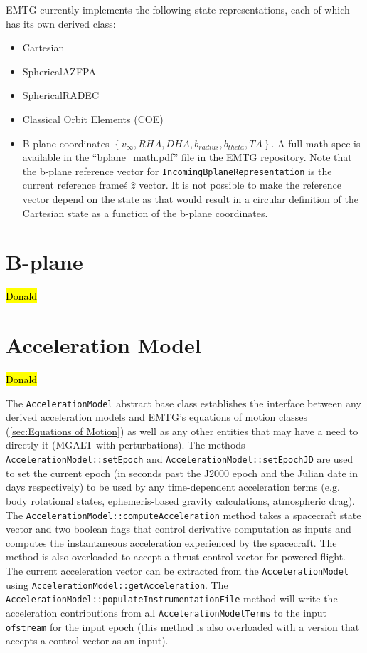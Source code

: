EMTG currently implements the following state representations, each of which has its own derived class:
\begin{itemize}
	\item Cartesian
	\item SphericalAZFPA
	\item SphericalRADEC
	\item Classical Orbit Elements (COE)
	\item B-plane coordinates $\left\{v_\infty, RHA, DHA, b_{radius}, b_{theta}, TA\right\}$. A full math spec is available in the ``bplane\_math.pdf'' file in the EMTG repository. Note that the b-plane reference vector for \texttt{IncomingBplaneRepresentation} is the current reference frame\'s $\hat z$ vector. It is not possible to make the reference vector depend on the state as that would result in a circular definition of the Cartesian state as a function of the b-plane coordinates.
\end{itemize}

\section{B-plane}
\label{sec:bplane}

\hl{Donald}

\section{Acceleration Model}
\label{sec:acceleration_model}

\hl{Donald}

The \texttt{AccelerationModel} abstract base class establishes the interface between any derived acceleration models and EMTG's equations of motion classes (\ref{sec:Equations of Motion}) as well as any other entities that may have a need to directly it (MGALT with perturbations). The methods \texttt{AccelerationModel::setEpoch} and \texttt{AccelerationModel::setEpochJD} are used to set the current epoch (in seconds past the J2000 epoch and the Julian date in days respectively) to be used by any time-dependent acceleration terms (e.g. body rotational states, ephemeris-based gravity calculations, atmospheric drag). The \texttt{AccelerationModel::computeAcceleration} method takes a spacecraft state vector and two boolean flags that control derivative computation as inputs and computes the instantaneous acceleration experienced by the spacecraft. The method is also overloaded to accept a thrust control vector for powered flight. The current acceleration vector can be extracted from the \texttt{AccelerationModel} using \texttt{AccelerationModel::getAcceleration}. The \texttt{AccelerationModel::populateInstrumentationFile} method will write the acceleration contributions from all \texttt{AccelerationModelTerms} to the input \texttt{ofstream} for the input epoch (this method is also overloaded with a version that accepts a control vector as an input). 

